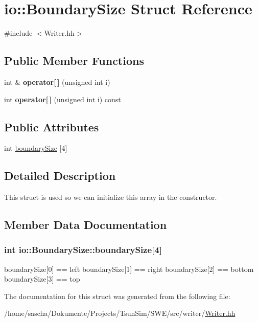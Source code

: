 \hypertarget{structio_1_1BoundarySize}{\section{io\-:\-:Boundary\-Size Struct Reference}
\label{structio_1_1BoundarySize}
}


{\ttfamily \#include $<$Writer.\-hh$>$}

\subsection*{Public Member Functions}
\begin{DoxyCompactItemize}
\item 
\hypertarget{structio_1_1BoundarySize_a4130ec88292d4a0eff9c402a90ef907d}{int \& {\bfseries operator\mbox{[}$\,$\mbox{]}} (unsigned int i)}\label{structio_1_1BoundarySize_a4130ec88292d4a0eff9c402a90ef907d}

\item 
\hypertarget{structio_1_1BoundarySize_ab7593d2a82890d5d255c30d1dd8fee08}{int {\bfseries operator\mbox{[}$\,$\mbox{]}} (unsigned int i) const }\label{structio_1_1BoundarySize_ab7593d2a82890d5d255c30d1dd8fee08}

\end{DoxyCompactItemize}
\subsection*{Public Attributes}
\begin{DoxyCompactItemize}
\item 
int \hyperlink{structio_1_1BoundarySize_ae1ac1aecc0b840076b68948dc2ceba8a}{boundary\-Size} \mbox{[}4\mbox{]}
\end{DoxyCompactItemize}


\subsection{Detailed Description}
This struct is used so we can initialize this array in the constructor. 

\subsection{Member Data Documentation}
\hypertarget{structio_1_1BoundarySize_ae1ac1aecc0b840076b68948dc2ceba8a}{
\subsubsection[{boundary\-Size}]{\setlength{\rightskip}{0pt plus 5cm}int io\-::\-Boundary\-Size\-::boundary\-Size\mbox{[}4\mbox{]}}}\label{structio_1_1BoundarySize_ae1ac1aecc0b840076b68948dc2ceba8a}
boundary\-Size\mbox{[}0\mbox{]} == left boundary\-Size\mbox{[}1\mbox{]} == right boundary\-Size\mbox{[}2\mbox{]} == bottom boundary\-Size\mbox{[}3\mbox{]} == top 

The documentation for this struct was generated from the following file\-:\begin{DoxyCompactItemize}
\item 
/home/sascha/\-Dokumente/\-Projects/\-Tsun\-Sim/\-S\-W\-E/src/writer/\hyperlink{Writer_8hh}{Writer.\-hh}\end{DoxyCompactItemize}
